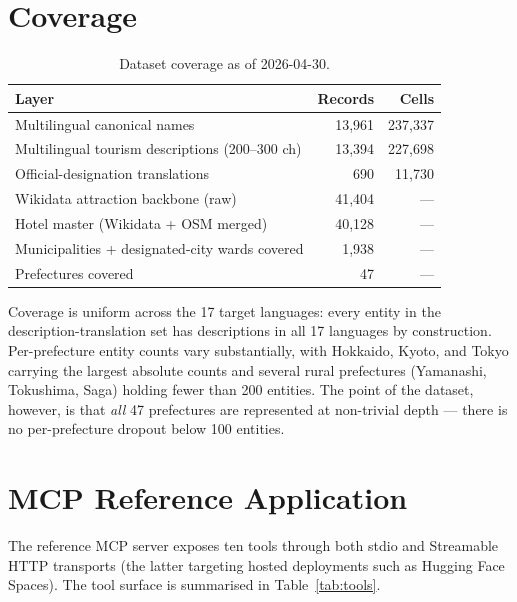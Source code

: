 \documentclass[11pt,a4paper]{article}
\begin{document}
\section{Coverage}
\label{sec:coverage}

\begin{table}[h]
\centering
\begin{tabular}{lrr}
\toprule
\textbf{Layer} & \textbf{Records} & \textbf{Cells} \\
\midrule
Multilingual canonical names                   & 13{,}961 & 237{,}337 \\
Multilingual tourism descriptions (200--300 ch)& 13{,}394 & 227{,}698 \\
Official-designation translations              &     690  &  11{,}730 \\
Wikidata attraction backbone (raw)             & 41{,}404 &        — \\
Hotel master (Wikidata + OSM merged)           & 40{,}128 &        — \\
Municipalities + designated-city wards covered &  1{,}938 &        — \\
Prefectures covered                            &     47   &        — \\
\bottomrule
\end{tabular}
\caption{Dataset coverage as of 2026-04-30.}
\label{tab:coverage}
\end{table}

Coverage is uniform across the 17 target languages: every entity in the
description-translation set has descriptions in all 17 languages by
construction. Per-prefecture entity counts vary substantially, with
Hokkaido, Kyoto, and Tokyo carrying the largest absolute counts and
several rural prefectures (Yamanashi, Tokushima, Saga) holding fewer
than 200 entities. The point of the dataset, however, is that
\textit{all} 47 prefectures are represented at non-trivial depth — there
is no per-prefecture dropout below 100 entities.

\section{MCP Reference Application}
\label{sec:app}

The reference MCP server exposes ten tools through both stdio and
Streamable HTTP transports (the latter targeting hosted deployments
such as Hugging Face Spaces). The tool surface is summarised in
Table~\ref{tab:tools}.
\end{document}
